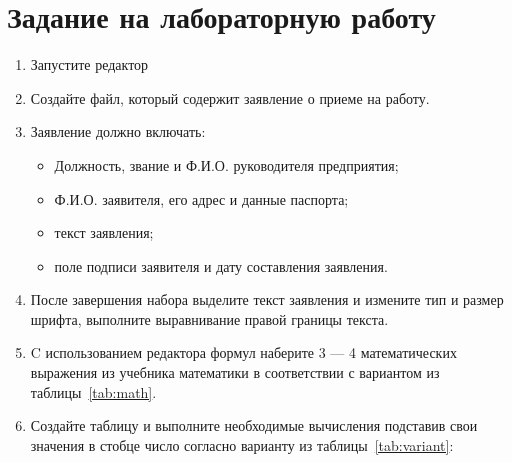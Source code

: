 \documentclass[a4paper]{article}
\begin{document}
\section{Задание на лабораторную работу}

\begin{enumerate}
  \item Запустите редактор
  \item Создайте файл, который содержит заявление о приеме на работу.
  \item Заявление должно включать:
  \begin{itemize}
    \item Должность, звание и Ф.И.О. руководителя предприятия;
	\item Ф.И.О. заявителя, его адрес и данные паспорта;
	\item текст заявления;
	\item поле подписи заявителя и дату составления заявления.
  \end{itemize}
  \item После завершения набора выделите текст заявления и измените тип и размер шрифта, выполните выравнивание правой границы текста.
  \item C использованием редактора формул наберите 3 --- 4 математических выражения из учебника математики в соответствии с вариантом из таблицы~\ref{tab:math}.
  \item Создайте таблицу и выполните необходимые вычисления подставив свои значения в стобце число согласно варианту из таблицы~\ref{tab:variant}:


\end{enumerate}
\end{document}
